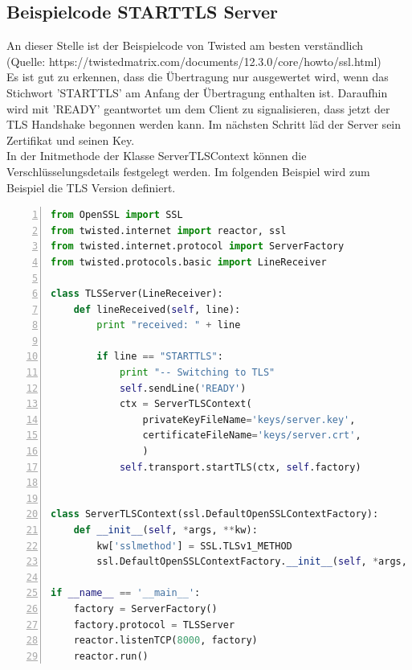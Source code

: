 \subsection{Beispielcode STARTTLS Server}
An dieser Stelle ist der Beispielcode von Twisted am besten verständlich\\
(Quelle: https://twistedmatrix.com/documents/12.3.0/core/howto/ssl.html)\\
Es ist gut zu erkennen, dass die Übertragung nur ausgewertet wird, wenn das Stichwort 'STARTTLS' am Anfang der Übertragung enthalten ist. Daraufhin wird mit 'READY' geantwortet um dem Client zu signalisieren, dass jetzt der TLS Handshake begonnen werden kann. Im nächsten Schritt läd der Server sein Zertifikat und seinen Key. \\
In der Initmethode der Klasse ServerTLSContext können die Verschlüsselungsdetails festgelegt werden. Im folgenden Beispiel wird zum Beispiel die TLS Version definiert.  \\
\begin{lstlisting}[caption =Testcode Echoserver mit Twisted Framework, language=python, frame=single, breaklines=true,columns=fullflexible, commentstyle=\color{gray}\upshape, captionpos=b, numbers = left]
from OpenSSL import SSL
from twisted.internet import reactor, ssl
from twisted.internet.protocol import ServerFactory
from twisted.protocols.basic import LineReceiver

class TLSServer(LineReceiver):
    def lineReceived(self, line):
        print "received: " + line

        if line == "STARTTLS":
            print "-- Switching to TLS"
            self.sendLine('READY')
            ctx = ServerTLSContext(
                privateKeyFileName='keys/server.key',
                certificateFileName='keys/server.crt',
                )
            self.transport.startTLS(ctx, self.factory)


class ServerTLSContext(ssl.DefaultOpenSSLContextFactory):
    def __init__(self, *args, **kw):
        kw['sslmethod'] = SSL.TLSv1_METHOD
        ssl.DefaultOpenSSLContextFactory.__init__(self, *args, **kw)

if __name__ == '__main__':
    factory = ServerFactory()
    factory.protocol = TLSServer
    reactor.listenTCP(8000, factory)
    reactor.run()
\end{lstlisting}


